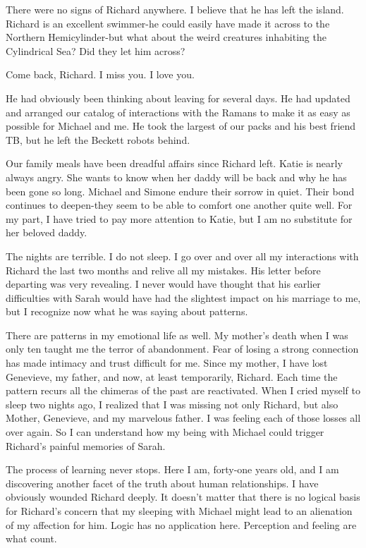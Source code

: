 \documentclass[]{article}
\begin{document}
There were no signs of Richard anywhere.  I believe that he has left the island.  Richard is an excellent swimmer-he could easily have made it across to the Northern Hemicylinder-but what about the weird creatures inhabiting the Cylindrical Sea? Did they let him across?

Come back, Richard.  I miss you.  I love you.

He had obviously been thinking about leaving for several days.  He had updated and arranged our catalog of interactions with the Ramans to make it as easy as possible for Michael and me.  He took the largest of our packs and his best friend TB, but he left the Beckett robots behind.

Our family meals have been dreadful affairs since Richard left.  Katie is nearly always angry.  She wants to know when her daddy will be back and why he has been gone so long.  Michael and Simone endure their sorrow in quiet.  Their bond continues to deepen-they seem to be able to comfort one another quite well.  For my part, I have tried to pay more attention to Katie, but I am no substitute for her beloved daddy.

The nights are terrible.  I do not sleep.  I go over and over all my interactions with Richard the last two months and relive all my mistakes.  His letter before departing was very revealing.  I never would have thought that his earlier difficulties with Sarah would have had the slightest impact on his marriage to me, but I recognize now what he was saying about patterns.

There are patterns in my emotional life as well.  My mother’s death when I was only ten taught me the terror of abandonment.  Fear of losing a strong connection has made intimacy and trust difficult for me.  Since my mother, I have lost Genevieve, my father, and now, at least temporarily, Richard.  Each time the pattern recurs all the chimeras of the past are reactivated.  When I cried myself to sleep two nights ago, I realized that I was missing not only Richard, but also Mother, Genevieve, and my marvelous father.  I was feeling each of those losses all over again.  So I can understand how my being with Michael could trigger Richard’s painful memories of Sarah.

The process of learning never stops.  Here I am, forty-one years old, and I am discovering another facet of the truth about human relationships.  I have obviously wounded Richard deeply.  It doesn’t matter that there is no logical basis for Richard’s concern that my sleeping with Michael might lead to an alienation of my affection for him.  Logic has no application here.  Perception and feeling are what count.
\end{document}
